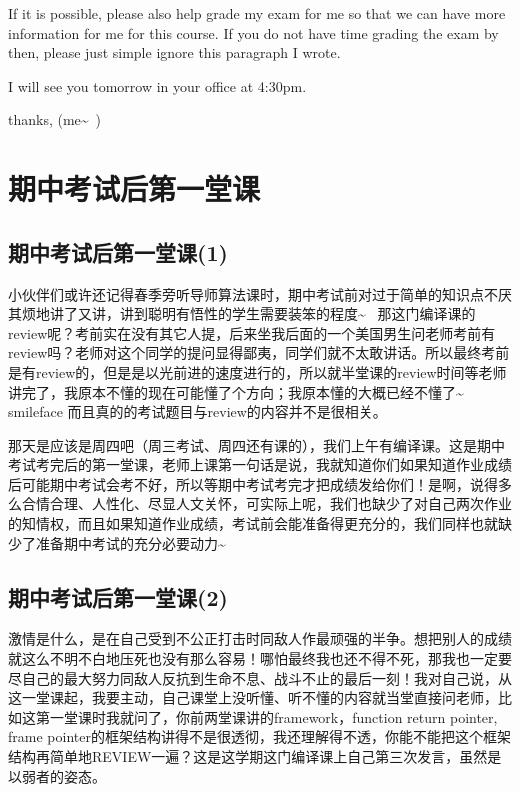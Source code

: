 \documentclass[12pt]{book}
\begin{document}
If it is possible, please also help grade my exam for me so that we can have more information for me for this course. If you do not have time grading the exam by then, please just simple ignore this paragraph I wrote. 

I will see you tomorrow in your office at 4:30pm. 

thanks,
(me\textasciitilde{}~)

\chapter{期中考试后第一堂课}
\label{sec-42}
\section{期中考试后第一堂课(1)}
\label{sec-42-1}

小伙伴们或许还记得春季旁听导师算法课时，期中考试前对过于简单的知识点不厌其烦地讲了又讲，讲到聪明有悟性的学生需要装笨的程度\textasciitilde{}~ 那这门编译课的review呢？考前实在没有其它人提，后来坐我后面的一个美国男生问老师考前有review吗？老师对这个同学的提问显得鄙夷，同学们就不太敢讲话。所以最终考前是有review的，但是是以光前进的速度进行的，所以就半堂课的review时间等老师讲完了，我原本不懂的现在可能懂了个方向；我原本懂的大概已经不懂了\textasciitilde{}~ smileface 而且真的的考试题目与review的内容并不是很相关。

那天是应该是周四吧（周三考试、周四还有课的），我们上午有编译课。这是期中考试考完后的第一堂课，老师上课第一句话是说，我就知道你们如果知道作业成绩后可能期中考试会考不好，所以等期中考试考完才把成绩发给你们！是啊，说得多么合情合理、人性化、尽显人文关怀，可实际上呢，我们也缺少了对自己两次作业的知情权，而且如果知道作业成绩，考试前会能准备得更充分的，我们同样也就缺少了准备期中考试的充分必要动力\textasciitilde{}~

\section{期中考试后第一堂课(2)}
\label{sec-42-2}

激情是什么，是在自己受到不公正打击时同敌人作最顽强的半争。想把别人的成绩就这么不明不白地压死也没有那么容易！哪怕最终我也还不得不死，那我也一定要尽自己的最大努力同敌人反抗到生命不息、战斗不止的最后一刻！我对自己说，从这一堂课起，我要主动，自己课堂上没听懂、听不懂的内容就当堂直接问老师，比如这第一堂课时我就问了，你前两堂课讲的framework，function return pointer, frame pointer的框架结构讲得不是很透彻，我还理解得不透，你能不能把这个框架结构再简单地REVIEW一遍？这是这学期这门编译课上自己第三次发言，虽然是以弱者的姿态。
\end{document}
